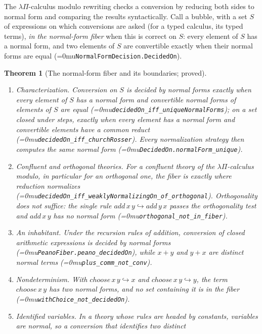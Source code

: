 \documentclass[11pt]{article}
\newcommand{\leanname}[1]{\textup{\Urlmuskip=0mu\relax\nolinkurl{#1}}}
\newtheorem{theorem}{Theorem}
\theoremstyle{definition}
\theoremstyle{remark}
\begin{document}
The $\lambda\Pi$-calculus modulo rewriting checks a conversion by reducing both
sides to normal form and comparing the results syntactically. Call a bubble,
with a set $S$ of expressions on which conversions are asked (for a typed
calculus, its typed terms), \emph{in the normal-form fiber} when this is
correct on $S$: every element of $S$ has a normal form, and two elements of $S$
are convertible exactly when their normal forms are equal
(\leanname{NormalFormDecision.DecidedOn}).

\begin{theorem}[The normal-form fiber and its boundaries; proved]
\label{thm:normal-form-fiber}
\leavevmode
\begin{enumerate}[leftmargin=*]
\item \emph{Characterization.} Conversion on $S$ is decided by normal forms
  exactly when every element of $S$ has a normal form and convertible normal
  forms of elements of $S$ are equal (\leanname{decidedOn_iff_uniqueNormalForms});
  on a set closed under steps, exactly when every element has a normal form and
  convertible elements have a common reduct
  (\leanname{decidedOn_iff_churchRosser}). Every normalization strategy then
  computes the same normal form (\leanname{DecidedOn.normalForm_unique}).
\item \emph{Confluent and orthogonal theories.} For a confluent theory of the
  $\lambda\Pi$-calculus modulo, in particular for an orthogonal one, the fiber
  is exactly where reduction normalizes
  (\leanname{decidedOn_iff_weaklyNormalizingOn_of_orthogonal}). Orthogonality
  does not suffice: the single rule $\mathit{add}\,x\,y \hookrightarrow
  \mathit{add}\,y\,x$ passes the orthogonality test and $\mathit{add}\,x\,y$
  has no normal form (\leanname{orthogonal_not_in_fiber}).
\item \emph{An inhabitant.} Under the recursion rules of addition, conversion of
  closed arithmetic expressions is decided by normal forms
  (\leanname{PeanoFiber.peano_decidedOn}), while $x+y$ and $y+x$ are distinct
  normal terms (\leanname{plus_comm_not_conv}).
\item \emph{Nondeterminism.} With $\mathit{choose}\,x\,y \hookrightarrow x$ and
  $\mathit{choose}\,x\,y \hookrightarrow y$, the term $\mathit{choose}\,x\,y$
  has two normal forms, and no set containing it is in the fiber
  (\leanname{withChoice_not_decidedOn}).
\item \emph{Identified variables.} In a theory whose rules are headed by
  constants, variables are normal, so a conversion that identifies two distinct

\end{enumerate}
\end{theorem}
\end{document}
